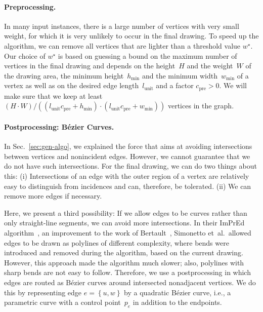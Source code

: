 \documentclass[]{llncs}
\newcommand{\lunit}{\ensuremath{l_\mathrm{unit}}\xspace}
\newcommand{\wmin}{\ensuremath{w^\star}\xspace}
\newcommand{\hmin}{\ensuremath{h_{\min}}\xspace}
\newcommand{\wimin}{\ensuremath{w_{\min}}\xspace}
\newcommand{\cpre}{\ensuremath{c_\mathrm{pre}}\xspace}
\begin{document}
\paragraph{Preprocessing.}
In many input instances, there is a large number of vertices with
very small weight, for which it is very unlikely to occur in the final
drawing. To speed up the algorithm, we can remove all vertices that
are lighter than a threshold value \wmin. Our choice of $\wmin$ is
based on guessing a bound on the maximum number of vertices in the
final drawing and depends on the height~$H$ and the weight~$W$ of the
drawing area, the minimum height~\hmin and the minimum width~\wimin of
a vertex as well as on the desired edge length~\lunit
and a factor $\cpre > 0$. We will make sure that we keep at least
$(H \cdot W)/\left( (\lunit \cpre + \hmin) \cdot (\lunit \cpre +
\wimin) \right)$ vertices in the graph.

\paragraph{Postprocessing: B\'ezier Curves.}
In Sec.~\ref{sec:gen-algo}, we explained the force that
aims at avoiding intersections between vertices and nonincident edges.
However, we cannot guarantee that we do not have such intersections.
For the final drawing, we can do two things about this: (i)
Intersections of an edge with the outer region of a vertex are
relatively easy to distinguish from incidences and can, therefore, be
tolerated. (ii) We can remove more edges if necessary.

Here, we present a third possibility: If we allow edges to be curves
rather than only straight-line segments, we can avoid more
intersections.
In their ImPrEd algorithm~\cite{Simonetto2011}, an improvement to the
work of Bertault~\cite{Bertault2000}, Simonetto et~al.\ allowed edges
to be drawn as polylines of different complexity, where bends were
introduced and removed during the algorithm, based on the current
drawing. However, this approach made the algorithm much slower; also,
polylines with sharp bends are not easy to follow. Therefore, we
use a postprocessing in which edges are routed as B\'ezier curves
around intersected nonadjacent vertices.
We do this by representing edge $e = \left\{ u,w \right\}$ by a
quadratic B\'ezier curve, i.e., a parametric curve with a control
point~$p_e$ in addition to the endpoints.
\end{document}
